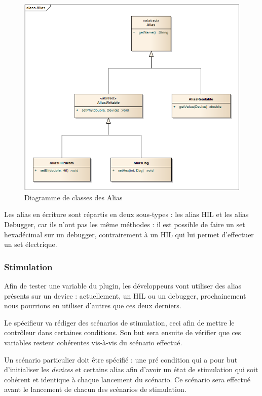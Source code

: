 		\begin{figure}[H]
			\centering
			\includegraphics[width=13cm]{contents/images/classAlias.png}
			\caption{Diagramme de classes des Alias}
		\end{figure}
		Les alias en écriture sont répartis en deux sous-types : les alias HIL et les alias Debugger, car ils n'ont pas les même méthodes : il est possible de faire un set hexadécimal sur un debugger, contrairement à un HIL qui lui permet d'effectuer un set électrique. 

	\subsubsection{Stimulation} \label{stim}
		Afin de tester une variable du plugin, les développeurs vont utiliser des alias présents sur un device : actuellement, un HIL ou un debugger, prochainement nous pourrions en utiliser d'autres que ces deux derniers.

		Le spécifieur va rédiger des scénarios de stimulation, ceci afin de mettre le contrôleur dans certaines conditions. Son but sera ensuite de vérifier que ces variables restent cohérentes vis-à-vis du scénario effectué. 

		Un scénario particulier doit être spécifié : une pré condition qui a pour but d'initialiser les \textit{devices} et certains alias afin d'avoir un état de stimulation qui soit cohérent et identique à chaque lancement du scénario. Ce scénario sera effectué avant le lancement de chacun des scénarios de stimulation.

